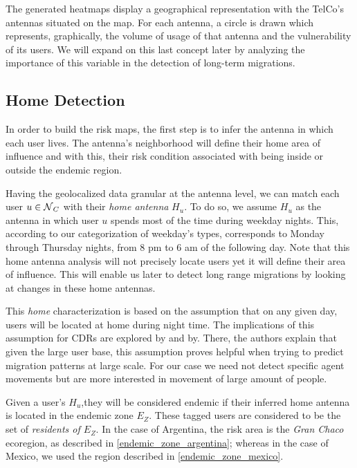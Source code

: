 The generated heatmaps display a geographical representation with the TelCo's antennas situated on the map.
For each antenna, a circle is drawn which represents, graphically, the volume of usage of that antenna and the vulnerability of its users.
We will expand on this last concept later by analyzing the importance of this variable in the detection of long-term migrations.

\subsection{Home Detection}\label{subsection:home_detection}

In order to build the risk maps, the first step is to infer the antenna in which each user lives.
The antenna's neighborhood will define their home area of influence and with this, their risk condition associated with being inside or outside the endemic region.

Having the geolocalized data granular at the antenna level, we can match each user $u \in \operatorname{\mathcal{N}}_C$ with their \textit{home antenna} $H_u$.
To do so, we assume $H_u$ as the antenna in which user $u$ spends most of the time during weekday nights.
This, according to our categorization of weekday's types, corresponds to Monday through Thursday nights, from 8 pm to 6 am of the following day.
Note that this home antenna analysis will not precisely locate users yet it will define their area of influence.
This will enable us later to detect long range migrations by looking at changes in these home antennas.

This \textit{home} characterization is based on the assumption that on any given day, users will be located at home during night time.
The implications of this assumption for CDRs are explored by \citep{sarraute2015socialevents} and by\citep{csaji2012exploring}.
There, the authors explain that given the large user base, this assumption proves helpful when trying to predict migration patterns at large scale.
For our case we need not detect specific agent movements but are more interested in movement of large amount of people.

Given a user's $H_u$,they will be considered endemic if their inferred home antenna is located in the endemic zone $E_Z$.
These tagged users are considered to be the set of \textit{residents of $E_Z$}.
In the case of Argentina, the risk area is the \textit{Gran Chaco} ecoregion, as described in \cref{endemic_zone_argentina};
whereas in the case of Mexico, we used the region described in \cref{endemic_zone_mexico}.


